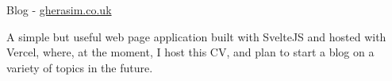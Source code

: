 \cventry
    {Blog - \href{https://gherasim.co.uk}{gherasim.co.uk}} %
    {} %
    {} %
    {} %
    {\begin{cvitems}
        \item{A simple but useful web page application built with SvelteJS and hosted with Vercel, where, at the moment, I host this CV, and plan to start a blog on a variety of topics in the future.}
    \end{cvitems}}